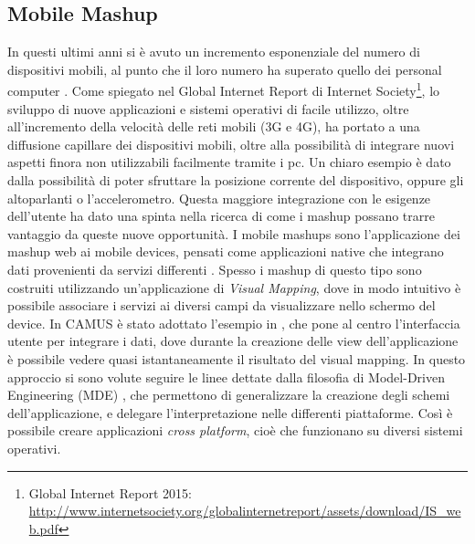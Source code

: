 \subsection{Mobile Mashup\label{sec:mobile-mashup}}

In questi ultimi anni si è avuto un incremento esponenziale del numero di dispositivi mobili, al punto che il loro numero ha superato quello dei personal computer \cite{10.1109/ICSC.2008.100}. Come spiegato nel Global Internet Report di Internet Society\footnote{Global Internet Report 2015: \url{http://www.internetsociety.org/globalinternetreport/assets/download/IS_web.pdf}}, lo sviluppo di nuove applicazioni e sistemi operativi di facile utilizzo, oltre all'incremento della velocità delle reti mobili (3G e 4G), ha portato a una diffusione capillare dei dispositivi mobili, oltre alla possibilità di integrare nuovi aspetti finora non utilizzabili facilmente tramite i pc. Un chiaro esempio è dato dalla possibilità di poter sfruttare la posizione corrente del dispositivo, oppure gli altoparlanti o l'accelerometro.
Questa maggiore integrazione con le esigenze dell'utente ha dato una spinta nella ricerca di come i mashup possano trarre vantaggio da queste nuove opportunità.
I mobile mashups sono l'applicazione dei mashup web ai mobile devices, pensati come applicazioni native che integrano dati provenienti da servizi differenti \cite{Cappiello2013}. 
Spesso i mashup di questo tipo sono costruiti utilizzando un'applicazione di \emph{Visual Mapping}, dove in modo intuitivo è possibile associare i servizi ai diversi campi da visualizzare nello schermo del device.
In CAMUS è stato adottato l'esempio in \cite{Cappiello:2015:UAE:2788341.2735632}, che pone al centro l'interfaccia utente per integrare i dati, dove durante la creazione delle view dell'applicazione è possibile vedere quasi istantaneamente il risultato del visual mapping. In questo approccio si sono volute seguire le linee dettate dalla filosofia di Model-Driven Engineering (MDE) \cite{schmidt2006model}, che permettono di generalizzare la creazione degli schemi dell'applicazione, e delegare l'interpretazione nelle differenti piattaforme. Così è possibile creare applicazioni \emph{cross platform}, cioè che funzionano su diversi sistemi operativi. 

